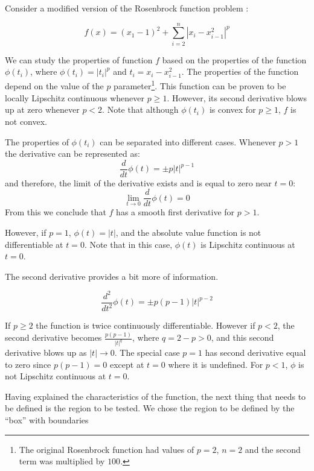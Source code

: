 Consider a modified version of the Rosenbrock function problem \citep{rosenbrock}:

\begin{equation} \label{modifiedrosenbrock}
    f(x) = (x_1 - 1)^2 + \sum_{i = 2}^n |x_i - x_{i - 1}^2|^p
\end{equation}

We can study the properties of function $f$ based on the properties of the function $\phi(t_i)$, where $\phi(t_i) = |t_i|^p$ and $t_i = x_i - x_{i - 1}^2$. The properties of the function depend on the value of the $p$ parameter\footnote{The original Rosenbrock function had values of $p = 2$, $n = 2$ and the second term was multiplied by $100$.}. This function can be proven to be locally Lipschitz continuous whenever $p \geq 1$. However, its second derivative blows up at zero whenever $p < 2$. Note that although $\phi(t_i)$ is convex for $p \geq 1$, $f$ is not convex.

The properties of $\phi(t_i)$ can be separated into different cases. Whenever $p > 1$ the derivative can be represented as:
\begin{equation}\label{firstderiv}
  \frac{d}{dt} \phi(t) = \pm p |t|^{p-1}
\end{equation}
and therefore, the limit of the derivative exists and is equal to zero near $t = 0$: \[ \lim_{t \to 0} \frac{d}{dt}\phi(t) = 0 \] From this we conclude that $f$ has a smooth first derivative for $p > 1$.

However, if $p = 1$, $\phi(t) = |t|$, and the absolute value function is not differentiable at $t = 0$. Note that in this case, $\phi(t)$ is Lipschitz continuous at $t = 0$.

The second derivative provides a bit more of information.

\begin{equation}\label{secondderiv}
  \frac{d^2}{dt^2} \phi(t) = \pm p(p-1) |t|^{p-2}
\end{equation}

If $p \geq 2$ the function is twice continuously differentiable. However if $p < 2$, the second derivative becomes $\frac{p(p-1)}{|t|^{q}}$, where $q = 2 - p > 0$, and this second derivative blows up as $|t| \to 0$. The special case $p = 1$ has second derivative equal to zero since $p(p-1) = 0$ except at $t = 0$ where it is undefined. For $p < 1$, $\phi$ is not Lipschitz continuous at $t = 0$.

Having explained the characteristics of the function, the next thing that needs to be defined is the region to be tested. We chose the region to be defined by the ``box'' with boundaries

